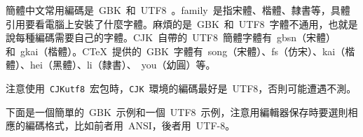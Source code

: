 簡體中文常用編碼是~GBK~和~UTF8~。family~是指宋體、楷體、隸書等，具體引用要看電腦上安裝了什麼字體。麻煩的是~GBK~和~UTF8~字體不通用，也就是說每種編碼需要自己的字體。CJK~自帶的~UTF8~簡體字體有~gbsn（宋體）和~gkai（楷體）。CTeX~提供的~GBK~字體有~song（宋體）、fs（仿宋）、kai（楷體）、hei（黑體）、li（隸書）、~you（幼圓）等。

注意使用~\verb|CJKutf8|~宏包時，\verb|CJK|~環境的編碼最好是~UTF8，否則可能遭遇不測。

下面是一個簡單的~GBK~示例和一個~UTF8~示例，注意用編輯器保存時要選則相應的編碼格式，比如前者用~ANSI，後者用~UTF-8。




\newpage

